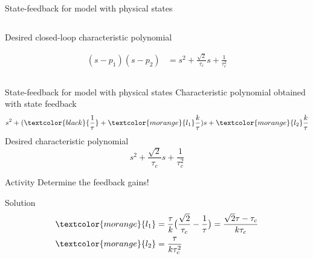 \documentclass[presentation,aspectratio=169]{beamer}
\begin{document}
\begin{frame}[label={sec:org45d4d4b}]{State-feedback for model with physical states}
\begin{columns}
\begin{column}{0.4\columnwidth}
\begin{center}
\end{center}

Desired closed-loop characteristic polynomial

\begin{align*}
  (s-p_1)(s-p_2) &= s^2 + \frac{\sqrt{2}}{\tau_c}s + \frac{1}{\tau_c^2}
\end{align*}
\end{column}
\end{columns}
\end{frame}


\begin{frame}[label={sec:org1eae8d2}]{State-feedback for model with physical states}
Characteristic polynomial obtained with state feedback
\[s^2 + (\textcolor{black}{\frac{1}{\tau}}  + \textcolor{morange}{l_1}\frac{k}{\tau})s +  \textcolor{morange}{l_2}\frac{k}{\tau} \]
Desired characteristic polynomial
\[  s^2 + \frac{\sqrt{2}}{\tau_c}s + \frac{1}{\tau_c^2}\]
\pause

\alert{Activity}
Determine the feedback gains!

\pause
\alert{Solution}
\pause
\begin{align*}
 \textcolor{morange}{l_1} &= \frac{\tau}{k}\big(\frac{\sqrt{2}}{\tau_c} - \frac{1}{\tau}\big) = \frac{\sqrt{2}\tau - \tau_c}{k\tau_c}\\
 \textcolor{morange}{l_2} &= \frac{\tau}{k\tau_c^2} 
\end{align*}
\end{frame}
\end{document}
